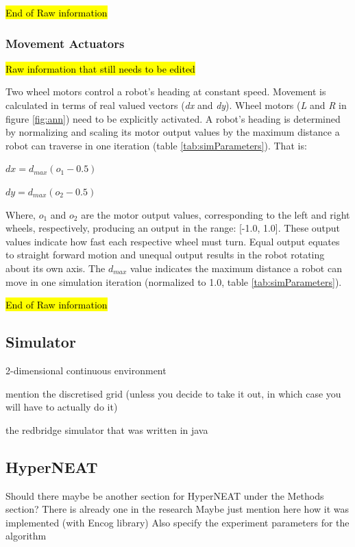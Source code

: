 \documentclass[conference]{IEEEtran}
\begin{document}
\hl{End of Raw information}

\subsubsection{Movement Actuators}
\hl{Raw information that still needs to be edited}

Two wheel motors control a robot's heading at constant speed.
Movement is calculated in terms of real valued vectors (\textit{dx}
and \textit{dy}).  Wheel motors (\textit{L} and \textit{R} in figure \ref{fig:ann})
need to be explicitly activated.
A robot's heading is determined by normalizing and scaling its motor
output values by the maximum distance a robot can traverse in one
iteration (table \ref{tab:simParameters}).  That is:

$\textit{dx} = d_{max} (o_{1} - 0.5)$

$\textit{dy} = d_{max} (o_{2} - 0.5)$

Where, $o_{1}$ and $o_{2}$ are the motor output values, corresponding
to the left and right wheels, respectively, producing an output in the range:
[-1.0, 1.0].
These output values indicate how fast each respective wheel must turn.
Equal output equates to straight forward motion and unequal output results
in the robot rotating about its own axis.
The $d_{max}$ value indicates the maximum distance a robot can move in
one simulation iteration (normalized to 1.0, table \ref{tab:simParameters}).

\hl{End of Raw information}



\subsection{Simulator}

2-dimensional continuous environment

mention the discretised grid (unless you decide to take it out, in which case you will have to actually do it)

the redbridge simulator that was written in java

\subsection{HyperNEAT}
Should there maybe be another section for HyperNEAT under the Methods section? 
There is already one in the research
Maybe just mention here how it was implemented (with Encog library)
Also specify the experiment parameters for the algorithm
\end{document}
